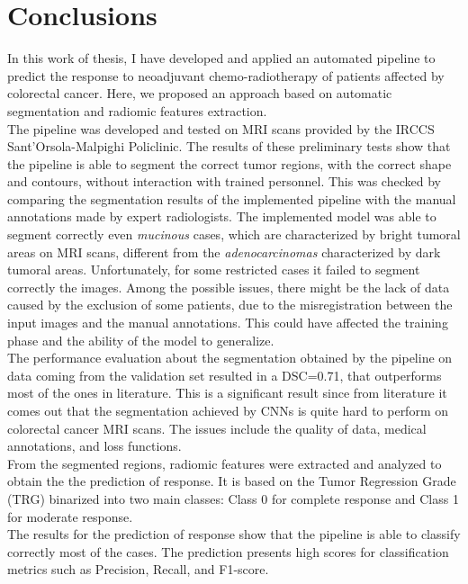 \documentclass{standalone}
\begin{document}
\chapter*{Conclusions}

In this work of thesis, I have developed and applied an automated pipeline to predict the response to neoadjuvant chemo-radiotherapy of patients affected by colorectal cancer.
Here, we proposed an approach based on automatic segmentation and radiomic features extraction.
\\
The pipeline was developed and tested on MRI scans provided by the IRCCS Sant'Orsola-Malpighi Policlinic.
The results of these preliminary tests show that the pipeline is able to segment the correct tumor regions, with the correct shape and contours, without interaction with trained personnel.
This was checked by comparing the segmentation results of the implemented pipeline with the manual annotations made by expert radiologists.
The implemented model was able to segment correctly even \textit{mucinous} cases, which are characterized by bright tumoral areas on MRI scans, different from the \textit{adenocarcinomas} characterized by dark tumoral areas.
Unfortunately, for some restricted cases it failed to segment correctly the images.
Among the possible issues, there might be the lack of data caused by the exclusion of some patients, due to the misregistration between the input images and the manual annotations. 
This could have affected the training phase and the ability of the model to generalize.
\\
The performance evaluation about the segmentation obtained by the pipeline on data coming from the validation set resulted in a DSC=0.71, that outperforms most of the ones in literature.
This is a significant result since from literature it comes out that the segmentation achieved by CNNs is quite hard to perform on colorectal cancer MRI scans.
The issues include the quality of data, medical annotations, and loss functions.
\\
From the segmented regions, radiomic features were extracted and analyzed to obtain the the prediction of response.
It is based on the Tumor Regression Grade (TRG) binarized into two main classes: Class 0 for complete response and Class 1 for moderate response.
\\
The results for the prediction of response show that the pipeline is able to classify correctly most of the cases.
The prediction presents high scores for classification metrics such as Precision, Recall, and F1-score.
\end{document}
